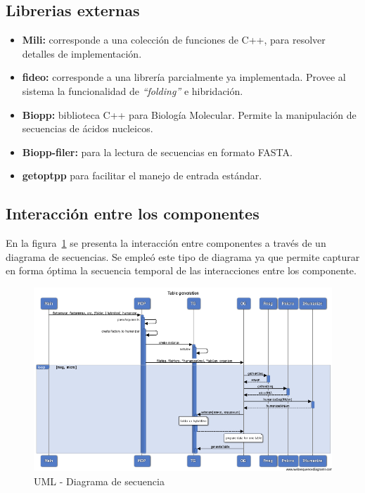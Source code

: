 \documentclass[12pt,a4paper,spanish]{article}
\begin{document}
\subsection{Librerias externas}
\begin{itemize}
    \item \textbf{Mili:} corresponde a una colección de funciones de C++, para resolver detalles de
     implementación.

    \item \textbf{fideo:} corresponde a una librería parcialmente ya implementada. Provee al sistema la
     funcionalidad de \emph{``folding''} e hibridación. 

    \item \textbf{Biopp:} biblioteca C++ para Biología Molecular. Permite la manipulación de secuencias de
    ácidos nucleicos.  

    \item \textbf{Biopp-filer:} para la lectura de secuencias en formato FASTA.    

    \item \textbf{getoptpp} para facilitar el manejo de entrada estándar.
\end{itemize}

\subsection{Interacción entre los componentes}
En la figura~\ref{mensajes} se presenta la interacción entre componentes a través de un diagrama de secuencias. Se empleó este tipo de diagrama ya que permite capturar en forma óptima la secuencia temporal de las interacciones entre los componente.

\begin{figure}
  \centering
  \includegraphics[scale=0.6, angle=90]{image/seqDiagrams.png}  
  \caption{UML - Diagrama de secuencia}
  \label{mensajes}
\end{figure}
\end{document}
